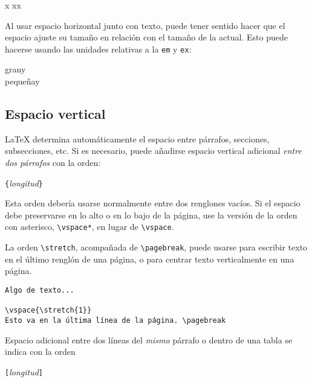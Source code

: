 \begin{example}
x
xx
\end{example}

Al usar espacio horizontal junto con texto, puede tener sentido hacer que el espacio ajuste su tamaño en relación con el tamaño de la \fontnomo{} actual.  Esto puede hacerse usando las unidades relativas a la \fontnomo{} \texttt{em} y \texttt{ex}:

\begin{example}
{\Large{}gran\hspace{1em}y}\\
{\tiny{}pequeña\hspace{1em}y}
\end{example}
 
\subsection{Espacio vertical}

\LaTeX{} determina automáticamente el espacio entre párrafos, secciones, subsecciones, etc. Si es necesario, puede añadirse espacio vertical adicional \emph{entre dos párrafos} con la orden:
\begin{lscommand}
\verb|{|\emph{longitud}\verb|}|
\end{lscommand}

Esta orden debería usarse normalmente entre dos renglones vacíos.  Si el espacio debe preservarse en lo alto o en lo bajo de la página, use la versión  de la orden con asterisco, \verb|\vspace*|, en lugar de \verb|\vspace|. 

La orden \verb|\stretch|, acompañada de \verb|\pagebreak|, puede usarse para escribir texto en el último renglón de una página, o para centrar texto verticalmente en una página.
\begin{code}
\begin{verbatim}
Algo de texto...

\vspace{\stretch{1}}
Esto va en la última línea de la página. \pagebreak
\end{verbatim}
\end{code}

Espacio adicional entre dos líneas del \emph{mismo} párrafo o dentro de una tabla se indica con la orden
\begin{lscommand}
\ci{\bs}\verb|[|\emph{longitud}\verb|]|
\end{lscommand}


